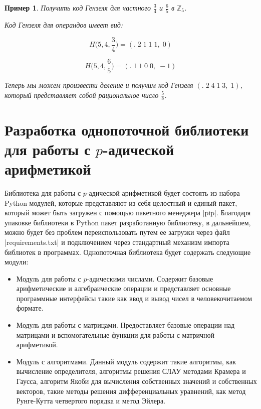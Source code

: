 \documentclass[master, och, diploma, times]{sty/SCWorks}
\theoremstyle{plain}
\newtheorem{exmp}{Пример}[section]
\theoremstyle{definition}
\begin{document}
\begin{exmp}
Получить код Гензеля для частного $\frac{3}{4}$ и $\frac{6}{5}$ в $\mathbb{Z}_5$.

\noindent Код Гензеля для операндов имеет вид:

$$H\bigg(5,4, \frac{3}{4}\bigg)=(.\; 2\; 1\; 1\; 1,\; 0)$$

$$H\bigg(5,4, \frac{6}{5}\bigg)=(.\; 1\; 1\; 0\; 0,\; -1)$$

\noindent Теперь мы можем произвести деление и получим код Гензеля $(.\; 2\; 4\; 1\; 3,\; 1)$, который представляет собой рациональное число $\frac{5}{8}$.
\end{exmp}

\section{Разработка однопоточной библиотеки для работы с $p$-адической арифметикой}

Библиотека для работы с $p$-адической арифметикой будет состоять из набора Python модулей, которые представляют из себя целостный и единый пакет, который может быть загружен с помощью пакетного менеджера |pip|. Благодаря упаковке библиотеки в Python пакет разработанную библиотеку, в дальнейшем, можно будет без проблем переиспользовать путем ее загрузки через файл |requirements.txt| и подключением через стандартный механизм импорта библиотек в программах. Однопоточная библиотека будет содержать следующие модули:

\begin{itemize}
\item Модуль для работы с $p$-адическими числами. Содержит базовые арифметические и алгебраические операции и представляет основные программные интерфейсы такие как ввод и вывод чисел в человекочитаемом формате.
\item Модуль для работы с матрицами. Предоставляет базовые операции над матрицами и вспомогательные функции для работы с матричной арифметикой.
\item Модуль с алгоритмами. Данный модуль содержит такие алгоритмы, как вычисление определителя, алгоритмы решения СЛАУ методами Крамера и Гаусса, алгоритм Якоби для вычисления собственных значений и собственных векторов, такие методы решения дифференциальных уравнений, как метод Рунге-Кутта четвертого порядка и метод Эйлера.
\end{itemize}
\end{document}
